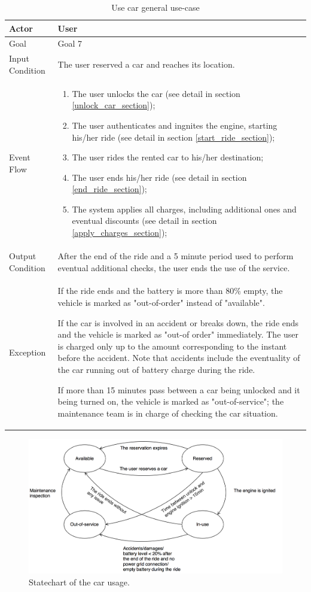 \begin{table}[H]
\begin{center}
\begin{tabular}{p{} | p{}}
\hline
Actor & User\\
\hline
Goal & Goal 7\\
\hline
Input Condition & The user reserved a car and reaches its location.\\
\hline
Event Flow & 
\begin{enumerate}
\item The user unlocks the car (see detail in section \ref{unlock_car_section});
\item The user authenticates and ingnites the engine, starting his/her ride (see detail in section \ref{start_ride_section});
\item The user rides the rented car to his/her destination;
\item The user ends his/her ride (see detail in section \ref{end_ride_section});
\item The system applies all charges, including additional ones and eventual discounts (see detail in section \ref{apply_charges_section});
\end{enumerate} \\
\hline
Output Condition & After the end of the ride and a 5 minute period used to perform eventual additional checks, the user ends the use of the service.\\
\hline
Exception & If the ride ends and the battery is more than 80\% empty, the vehicle is marked as "out-of-order" instead of "available".

If the car is involved in an accident or breaks down, the ride ends and the vehicle is marked as "out-of order" immediately. The user is charged only up to the amount corresponding to the instant before the accident. Note that accidents include the eventuality of the car running out of battery charge during the ride.

If more than 15 minutes pass between a car being unlocked and it being turned on, the vehicle is marked as "out-of-service"; the maintenance team is in charge of checking the car situation.\\
\hline
\end{tabular}
\end{center}
\caption{Use car general use-case}
\label{use_car_uc}
\end{table}

\begin{figure}[H]
\begin{center}
		\includegraphics[width=\textwidth]{./specific_requirements/features/diagrams/use_car_sc.png}
		\caption{Statechart of the car usage.}
		\label{use_car_sc}
\end{center}
\end{figure}